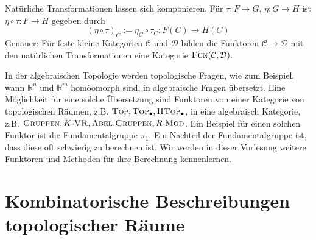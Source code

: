 Natürliche Transformationen lassen sich komponieren. 
Für $\tau \colon F \to G$, $\eta \colon G \to H$ ist $\eta \circ \tau \colon F \to H$ gegeben durch
\[
	(\eta \circ \tau)_C :=  \eta_C \circ \tau_C \colon F(C) \to H(C)
\]
Genauer: Für feste kleine Kategorien $\mathcal{C}$ und $\mathcal{D}$ bilden die Funktoren $\mathcal{C} \to \mathcal{D}$ mit den natürlichen Transformationen eine Kategorie $\textsc{Fun}(\mathcal{C}, \mathcal{D})$.

In der algebraischen Topologie werden topologische Fragen, wie zum Beispiel, wann $\mathbb{R}^n$ und $\mathbb{R}^m$ homöomorph sind, in algebraische Fragen übersetzt. 
Eine Möglichkeit für eine solche Übersetzung sind Funktoren von einer Kategorie von topologischen Räumen, z.B. $\textsc{Top}, \textsc{Top}_\bullet, \textsc{HTop}_\bullet$, in eine algebraisch Kategorie, z.B. $\textsc{Gruppen}, K\text{-}\textsc{VR}, \textsc{Abel.Gruppen}, R\text{-}\textsc{Mod}$. 
Ein Beispiel für einen solchen Funktor ist die Fundamentalgruppe $\pi_1$. 
Ein Nachteil der Fundamentalgruppe ist, dass diese oft schwierig zu berechnen ist. 
Wir werden in dieser Vorlesung weitere Funktoren und Methoden für ihre Berechnung kennenlernen.

\newpage

\section{Kombinatorische Beschreibungen topologischer Räume} %
\label{sec:2}

